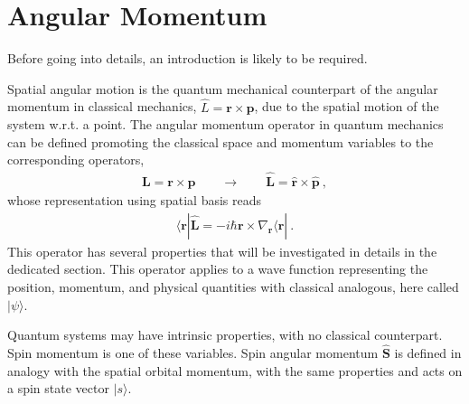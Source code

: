\documentclass[letterpaper,10pt,english]{jupyterBook}
\begin{document}
\chapter{Angular Momentum}
\label{\detokenize{ch/quantum-mechanics/angular-momentum:angular-momentum}}\label{\detokenize{ch/quantum-mechanics/angular-momentum:quantum-mechanics-angular-momentum}}\label{\detokenize{ch/quantum-mechanics/angular-momentum::doc}}
\sphinxAtStartPar
Before going into details, an introduction is likely to be required.

\sphinxAtStartPar
{} Spatial angular motion is the quantum mechanical counterpart of the angular momentum in classical mechanics, \(\hat{L} = \mathbf{r} \times \mathbf{p}\), due to the spatial motion of the system w.r.t. a point. The angular momentum operator in quantum mechanics can be defined promoting the classical space and momentum variables to the corresponding operators,
\begin{equation*}
\begin{split}\mathbf{L} = \mathbf{r} \times \mathbf{p} \qquad \rightarrow \qquad \hat{\mathbf{L}} = \hat{\mathbf{r}} \times \hat{\mathbf{p}} \ ,\end{split}
\end{equation*}
\sphinxAtStartPar
whose representation using spatial basis reads
\begin{equation*}
\begin{split}\langle \mathbf{r} | \hat{\mathbf{L}} = -i \hbar \mathbf{r} \times \nabla_{\mathbf{r}} \langle \mathbf{r} | \ .\end{split}
\end{equation*}
\sphinxAtStartPar
This operator has several properties that will be investigated in details in the dedicated section. This operator applies to a wave function representing the position, momentum, and physical quantities with classical analogous, here called \(| \psi \rangle\).

\sphinxAtStartPar
{} Quantum systems may have intrinsic properties, with no classical counterpart. Spin momentum is one of these variables. Spin angular momentum \(\hat{\mathbf{S}}\) is defined in analogy with the spatial orbital momentum, with the same properties and acts on a spin state vector \(| s \rangle\).
\end{document}
